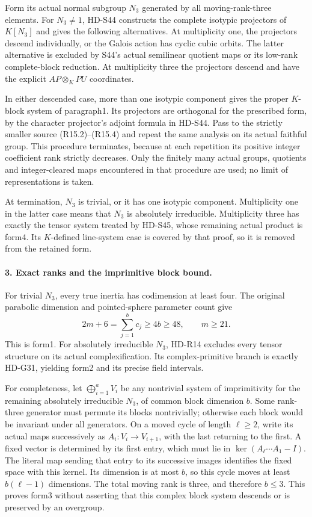 Form its actual normal subgroup \(N_3\) generated by all
moving-rank-three elements. For \(N_3\ne1\), HD-S44
constructs the complete isotypic projectors of \(K[N_3]\)
and gives the following alternatives. At multiplicity one,
the projectors descend individually, or the Galois action
has cyclic cubic orbits. The latter alternative is excluded
by S44's actual semilinear quotient maps or its low-rank
complete-block reduction. At multiplicity three the
projectors descend and have the explicit
\(AP\otimes_K PU\) coordinates.

In either descended case, more than one isotypic component
gives the proper \(K\)-block system of paragraph1.
Its projectors are orthogonal for the prescribed form,
by the character projector's adjoint formula in HD-S44.
Pass to the strictly smaller source (R15.2)--(R15.4) and
repeat the same analysis on its actual faithful group.
This procedure terminates, because at each repetition its
positive integer coefficient rank strictly decreases.
Only the finitely many actual groups, quotients and
integer-cleared maps encountered in that procedure are
used; no limit of representations is taken.

At termination, \(N_3\) is trivial, or it has one
isotypic component. Multiplicity one in the latter case
means that \(N_3\) is absolutely irreducible.
Multiplicity three has exactly the tensor system treated
by HD-S45, whose remaining actual product is form4.
Its \(K\)-defined line-system case is covered by that
proof, so it is removed from the retained form.

\paragraph{3. Exact ranks and the imprimitive block bound.}
For trivial \(N_3\), every true inertia has codimension
at least four. The original parabolic dimension and
pointed-sphere parameter count give
\[
             2m+6=\sum_{j=1}^{b}c_j\ge4b\ge48,
                          \qquad m\ge21.                  \tag{R15.5}
\]
This is form1. For absolutely irreducible \(N_3\), HD-R14
excludes every tensor structure on its actual
complexification. Its complex-primitive branch is exactly
HD-G31, yielding form2 and its precise field intervals.

For completeness, let \(\bigoplus_{i=1}^a V_i\) be
any nontrivial system of imprimitivity for the remaining
absolutely irreducible \(N_3\), of common block dimension
\(b\). Some rank-three generator must permute its blocks
nontrivially; otherwise each block would be invariant under
all generators. On a moved cycle of length \(\ell\ge2\),
write its actual maps successively as
\(A_i:V_i\to V_{i+1}\), with the last returning to the
first. A fixed vector is determined by its first entry,
which must lie in
\(\ker(A_\ell\cdots A_1-I)\). The literal map sending
that entry to its successive images identifies the fixed
space with this kernel. Its dimension is at most \(b\),
so this cycle moves at least \(b(\ell-1)\) dimensions.
The total moving rank is three, and therefore \(b\le3\).
This proves form3 without asserting that this complex
block system descends or is preserved by an overgroup.

